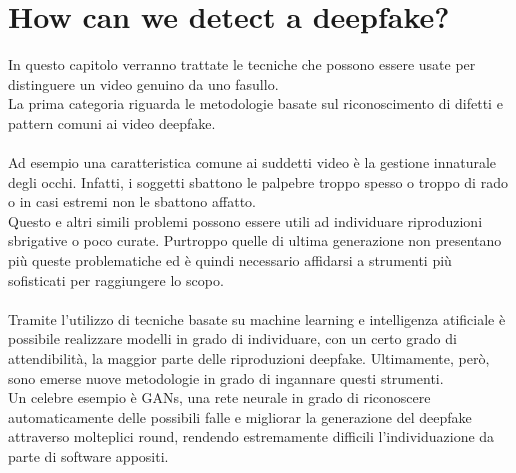 \documentclass[12pt, a4paper]{article}
\begin{document}
\section{How can we detect a deepfake?}
In questo capitolo verranno trattate le tecniche che possono essere usate per distinguere un video genuino da uno fasullo.\\ La prima categoria riguarda le metodologie basate sul riconoscimento di difetti e pattern comuni ai video deepfake.\\\\
Ad esempio una caratteristica comune ai suddetti video è la gestione innaturale degli occhi. Infatti, i soggetti sbattono le palpebre troppo spesso o troppo di rado o in casi estremi non le sbattono affatto.\\
Questo e altri simili problemi possono essere utili ad individuare riproduzioni sbrigative o poco curate. Purtroppo quelle di ultima generazione non presentano più queste problematiche ed è quindi necessario affidarsi a strumenti più sofisticati per raggiungere lo scopo.\\\\
Tramite l'utilizzo di tecniche basate su machine learning e intelligenza atificiale è possibile realizzare modelli in grado di individuare, con un certo grado di attendibilità, la maggior parte delle riproduzioni deepfake. Ultimamente, però, sono emerse nuove metodologie in grado di ingannare questi strumenti.\\
Un celebre esempio è GANs, una rete neurale in grado di riconoscere automaticamente delle possibili falle e migliorar la generazione del deepfake attraverso molteplici round, rendendo estremamente difficili l'individuazione da parte di software appositi.\\\\

\newpage


\end{document}
